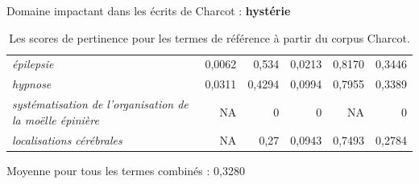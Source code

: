 \begin{frame}{Domaine impactant dans les écrits de Charcot : \textbf{hystérie}}
\begin{table}[h]
{\begin{tabular}{|l|r|r|r|r|r|}
				\textit{épilepsie} & 0,0062 & 0,534 & 0,0213 & 0,8170 & 0,3446 \\
				\textit{hypnose} & 0,0311 & 0,4294 & 0,0994 & 0,7955 & 0,3389\\
				\textit{systématisation de l'organisation de la moëlle épinière} & NA & 0 & 0 & NA & 0 \\
				\textit{localisations cérébrales} & NA & 0,27 & 0,0943 & 0,7493 & 0,2784 \\
				\hline
			\end{tabular}
		}
		\caption{Les scores de pertinence pour les termes de référence à partir du corpus \og{}Charcot\fg{}.}
	\end{table}
	{\small Moyenne pour tous les termes combinés : 0,3280}
\end{frame}



